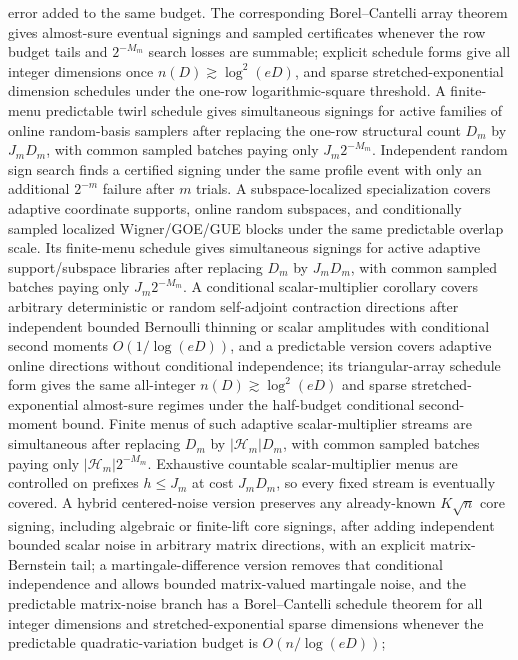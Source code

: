 \documentclass[11pt]{article}
\begin{document}
error added to the same budget.  The corresponding Borel--Cantelli array theorem
gives almost-sure eventual signings and sampled certificates whenever the row
budget tails and \(2^{-M_m}\) search losses are summable; explicit schedule
forms give all integer dimensions once \(n(D)\gtrsim\log^2(eD)\), and sparse
stretched-exponential dimension schedules under the one-row logarithmic-square
threshold.  A finite-menu predictable twirl schedule gives simultaneous
signings for active families of online random-basis samplers after replacing
the one-row structural count \(D_m\) by \(J_mD_m\), with common sampled batches
paying only \(J_m2^{-M_m}\).  Independent random sign search finds a certified
signing under the
same profile event with only an additional \(2^{-m}\) failure after \(m\) trials.
A
subspace-localized specialization covers adaptive coordinate supports, online
random subspaces, and conditionally sampled localized Wigner/GOE/GUE blocks
under the same predictable overlap scale.  Its finite-menu schedule gives
simultaneous signings for active adaptive support/subspace libraries after
replacing \(D_m\) by \(J_mD_m\), with common sampled batches paying only
\(J_m2^{-M_m}\).  A
conditional scalar-multiplier corollary covers arbitrary
deterministic or random self-adjoint contraction directions after independent
bounded Bernoulli thinning or scalar amplitudes with conditional second moments
\(O(1/\log(eD))\), and a predictable version covers adaptive online directions
without conditional independence; its triangular-array schedule form gives the
same all-integer \(n(D)\gtrsim\log^2(eD)\) and sparse stretched-exponential
almost-sure regimes under the half-budget conditional second-moment bound.
Finite menus of such adaptive scalar-multiplier streams are simultaneous after
replacing \(D_m\) by \(|\mathcal H_m|D_m\), with common sampled batches paying
only \(|\mathcal H_m|2^{-M_m}\).  Exhaustive countable scalar-multiplier menus
are controlled on prefixes \(h\le J_m\) at cost \(J_mD_m\), so every fixed
stream is eventually covered.  A
hybrid centered-noise version preserves any already-known
\(K\sqrt n\) core signing, including algebraic or finite-lift core signings,
after adding independent bounded scalar noise in arbitrary matrix directions,
with an explicit matrix-Bernstein tail; a martingale-difference version removes
that conditional independence and allows bounded matrix-valued martingale noise,
and the predictable matrix-noise branch has a Borel--Cantelli schedule theorem
for all integer dimensions and stretched-exponential sparse dimensions whenever
the predictable quadratic-variation budget is \(O(n/\log(eD))\);
\end{document}
